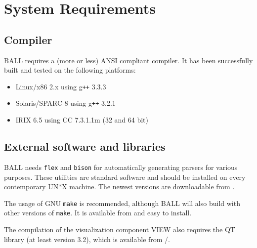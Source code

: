\section{System Requirements}

\subsection{Compiler}
  BALL requires a (more or less) ANSI compliant \CPP compiler.
  It has been successfully built and tested on the following platforms:
	\begin{itemize}	
   	\item Linux/x86 2.x using g{\tt ++} 3.3.3
   	\item Solaris/SPARC 8 using g{\tt ++} 3.2.1
   	\item IRIX 6.5 using CC 7.3.1.1m (32 and 64 bit)
 	\end{itemize}

\subsection{External software and libraries}
BALL needs {\tt flex} and {\tt bison} for automatically generating parsers
for various purposes. These utilities are standard software and should be
installed on every contemporary UN*X machine. The newest versions are
downloadable from .

The usage of GNU {\tt make} is recommended, although BALL will also build with
other versions of {\tt make}. It is available from 
and easy to install.

The compilation of the visualization component VIEW also requires
the QT library (at least version 3.2), which is available from
/.

